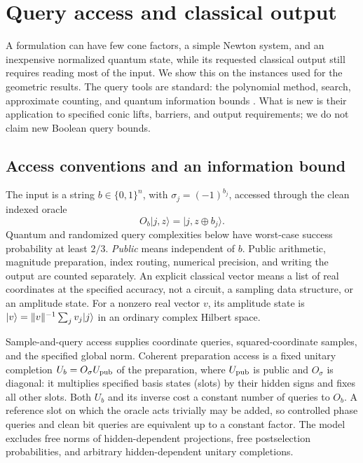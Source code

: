 \section{Query access and classical output}\label{query:section}
A formulation can have few cone factors, a simple Newton system, and an
inexpensive normalized quantum state, while its requested classical output
still requires reading most of the input. We show this on the instances
used for the geometric results. The query tools are standard: the
polynomial method, search, approximate counting, and quantum information
bounds \citep{Beals2001,BBBV1997,NayakWu1999,BHMT2002,Nayak1999}. What is
new is their application to specified conic lifts, barriers, and output
requirements; we do not claim new Boolean query bounds.

\subsection{Access conventions and an information bound}
The input is a string $b\in\{0,1\}^n$, with $\sigma_j=(-1)^{b_j}$,
accessed through the clean indexed oracle
\[
 O_b|j,z\rangle=|j,z\mathbin\oplus b_j\rangle.
\]
Quantum and randomized query complexities below have worst-case success
probability at least $2/3$. \emph{Public} means independent of $b$.
Public arithmetic, magnitude preparation, index routing, numerical
precision, and writing the output are counted separately. An explicit classical vector means a list of real coordinates at the
specified accuracy, not a circuit, a sampling data structure, or
an amplitude state. For a nonzero real vector $v$, its amplitude state is
$|v\rangle=\lVert v\rVert^{-1}\sum_jv_j|j\rangle$ in an ordinary complex
Hilbert space.

Sample-and-query access supplies coordinate queries, squared-coordinate samples, and the specified global norm.
Coherent preparation access is a fixed unitary completion
$U_b=O_\sigma U_{\rm pub}$ of the preparation, where $U_{\rm pub}$ is
public and $O_\sigma$ is diagonal: it multiplies specified basis states
(slots) by their hidden signs and fixes all other slots. Both $U_b$ and its
inverse cost a constant number of queries to $O_b$.
A reference slot on which the oracle acts trivially may be added, so
controlled phase queries and clean bit queries are equivalent up to a
constant factor. The model excludes free norms of hidden-dependent
projections, free postselection probabilities, and arbitrary
hidden-dependent unitary completions.

